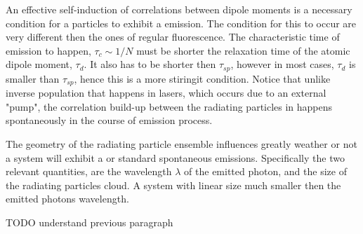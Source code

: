 An effective self-induction of correlations between dipole moments is a necessary condition for a particles to exhibit a \superradiance emission. The condition for this to occur are very different then the ones of regular fluorescence. The characteristic time of \superradiance emission to happen, $\tau_c \sim 1/N $ must be shorter the relaxation time of the atomic dipole moment, $\tau_d$. It also has to be shorter then $\tau_{sp}$, however in most cases, $\tau_{d}$ is smaller than $\tau_{sp}$, hence this is a more stiringit condition. Notice that unlike inverse population that happens in lasers, which occurs due to an external "pump", the correlation build-up between the radiating particles in \superradiance happens spontaneously in the course of emission process.

The geometry of the radiating particle ensemble influences greatly weather or not a system will exhibit a \superradiance or standard spontaneous emissions. Specifically the two relevant quantities, are the wavelength $\lambda$ of the emitted photon, and the size of the radiating particles cloud. A system with linear size much smaller then the emitted photons wavelength.   

TODO understand previous paragraph


